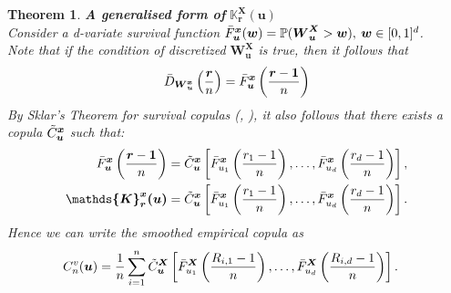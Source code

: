 \documentclass[12pt]{report}
\newtheorem{theorem}{Theorem}[subsection]
\newcommand{\1}{\mathbf{1}}
\begin{document}
\begin{flushleft}
\begin{theorem}\label{sklaronsmoothcopula}
\textit{\normalfont\parencite{KojadinovicYi2024Smooth}}\:
\textbf{A generalised form of} $\boldsymbol{\mathds{K}_{\boldsymbol{r}}^{\boldsymbol{X}}(\boldsymbol{u})}$ \\
Consider a d-variate survival function $\Bar{F}_{\boldsymbol{u}}^{\boldsymbol{x}}(\boldsymbol{w}) = \mathbb{P} (\boldsymbol{W}^{\boldsymbol{X}}_{\boldsymbol{u}} > \boldsymbol{w} ), \: \boldsymbol{w} \in [0,1]^{d}$.\\
Note that if the condition of discretized $\textbf{W}^{\textbf{X}}_{\textbf{u}}$ is true, then it follows that
\begin{align*}
\Bar{D}_{\boldsymbol{W}^{\boldsymbol{x}}_{\boldsymbol{u}}}\left(\frac{\boldsymbol{r}}{n}\right) = \Bar{F}_{\boldsymbol{u}}^{\boldsymbol{x}}\left(\frac{\boldsymbol{r} - \boldsymbol{1}}{n}\right)
\end{align*}
By Sklar's Theorem for survival copulas (\cite{HofertBook}, \cite{SklarTheorem}), it also follows that there exists a copula $\Tilde{C}_{\boldsymbol{u}}^{\boldsymbol{x}}$ such that:
\begin{align*}
\Bar{F}_{\boldsymbol{u}}^{\boldsymbol{x}}\left(\frac{\boldsymbol{r} - \boldsymbol{1}}{n}\right) &= \Tilde{C}_{\boldsymbol{u}}^{\boldsymbol{x}} \left[\Bar{F}_{u_{1}}^{\boldsymbol{x}}\left(\frac{r_{1} - 1}{n}\right), \dots, \Bar{F}_{u_{d}}^{\boldsymbol{x}}\left(\frac{r_{d} - 1}{n}\right) \right],\\
\boldsymbol{\mathds{K}_{\boldsymbol{r}}^{\boldsymbol{x}}(\boldsymbol{u})} &= \Tilde{C}_{\boldsymbol{u}}^{\boldsymbol{x}} \left[\Bar{F}_{u_{1}}^{\boldsymbol{x}}\left(\frac{r_{1} - 1}{n}\right), \dots, \Bar{F}_{u_{d}}^{\boldsymbol{x}}\left(\frac{r_{d} - 1}{n}\right) \right].
\end{align*}
Hence we can write the smoothed empirical copula as
\begin{align*}
C_{n}^{v}(\boldsymbol{u}) &= \frac{1}{n} \sum\limits_{i = 1}^{n} \Tilde{C}_{\boldsymbol{u}}^{\boldsymbol{X}} \left[\Bar{F}_{u_{1}}^{\boldsymbol{X}}\left(\frac{R_{i,1} - 1}{n}\right), \dots, \Bar{F}_{u_{d}}^{\boldsymbol{X}}\left(\frac{R_{i,d} - 1}{n}\right) \right].
\end{align*}
\end{theorem}


\end{flushleft}
\end{document}
